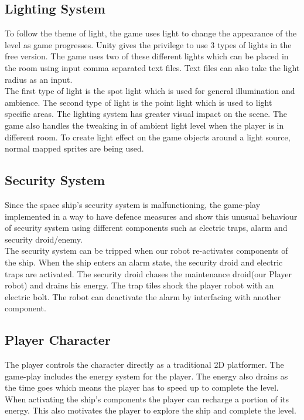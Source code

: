 \documentclass[11pt]{article}
\begin{document}
\subsection{Lighting System}
To follow the theme of light, the game uses light to change the appearance of the level as game progresses. Unity gives the privilege to use 3 types of lights in the free version. The game uses two of these different lights which can be placed in the room using input comma separated text files. Text files can also take the light radius as an input.\\

The first type of light is the spot light which is used for general illumination and ambience. The second type of light is the point light which is used to light specific areas. The lighting system has greater visual impact on the scene. The game also handles the tweaking in of ambient light level when the player is in different room. To create light effect on the game objects around a light source, normal mapped sprites are being used.
\subsection{Security System}
Since the space ship's security system is malfunctioning, the game-play implemented in a way to have defence measures and show this unusual behaviour of security system using different components such as  electric traps, alarm and security droid/enemy.\\

The security system can be tripped when our robot re-activates components of the ship. When the ship enters an alarm state, the security droid and electric traps are activated. The security droid chases the maintenance droid(our Player robot) and drains his energy. The trap tiles shock the player robot with an electric bolt. The robot can deactivate the alarm by interfacing with another component.
\subsection{Player Character}
The player controls the character directly as a traditional 2D platformer. The game-play includes the energy system for the player. The energy also drains as the time goes which means the player has to speed up to complete the level. When activating the ship's components the player can recharge a portion of its energy. This also motivates the player to explore the ship and complete the level.\\
\end{document}
